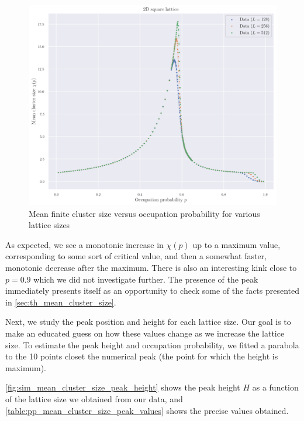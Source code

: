 \begin{figure}[H]
  \includegraphics[width=\linewidth]{Images/sim_mean_cluster_size_1.png}
  \caption{Mean finite cluster size versus occupation probability for various lattice sizes}
  \label{fig:sim_mean_cluster_size_1}
\end{figure}


As expected, we see a monotonic increase in $\chi(p)$ up to a maximum value, corresponding to some sort of critical value, and then a somewhat faster, monotonic decrease after the maximum. There is also an interesting kink close to $p=0.9$ which we did not investigate further.
The presence of the peak immediately presents itself as an opportunity to check some of the facts presented in \autoref{sec:th_mean_cluster_size}. 


Next, we study the peak position and height for each lattice size. Our goal is to make an educated guess on how these values change as we increase the lattice size. To estimate the peak height and occupation probability, we fitted a parabola to the 10 points closet the numerical peak (the point for which the height is maximum).

\autoref{fig:sim_mean_cluster_size_peak_height} shows the peak height $H$ as a function of the lattice size we obtained from our data, and \autoref{table:pp_mean_cluster_size_peak_values} shows the precise values obtained.

